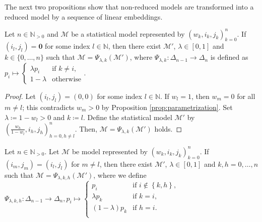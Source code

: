 The next two propositions show that non-reduced models are transformed into a reduced model by a sequence of linear embeddings.

\begin{proposition}\label{prop:linear-embedding-1}
    Let \( n \in \mathbb{N}_{>0} \) and \( \mathcal{M} \) be a statistical model represented by \( (w_k, i_k, j_k)_{k=0}^n \). If \( (i_l, j_l) = \mathbf{0} \) for some index \( l \in \mathbb{N} \), then there exist \( \mathcal{M}' \), \( \lambda \in [0,1] \) and \( k \in \{ 0, \dots, n \} \) such that \( \mathcal{M} = \Psi_{\lambda,k}(\mathcal{M}') \), where \( \Psi_{\lambda, k}: \Delta_{n-1} \to \Delta_n \) is defined as \(  p_i \mapsto \begin{cases}
        \lambda p_i & \text{if } k \neq i, \\
        1-\lambda & \text{otherwise}
    \end{cases} \).
\end{proposition}

\begin{proof}
    Let \( (i_l, j_l) = (0,0) \) for some index \( l \in \mathbb{N} \). If \( w_l = 1 \), then \( w_m = 0 \) for all \( m \neq l \); this contradicts \( w_m > 0 \) by Proposition \ref{prop:parametrization}. Set \( \lambda \coloneqq 1 - w_l > 0 \) and \( k \coloneqq l \). Define the statistical model \( \mathcal{M}' \) by \( \left(\frac{w_h}{1-w_l}, i_h, j_h\right)^n_{h=0, h \neq l} \).
    Then, \( \mathcal{M} = \Psi_{\lambda,k}(\mathcal{M}') \) holds.
\end{proof}

\begin{proposition}\label{prop:linear-embedding-2}
    Let \( n \in \mathbb{N}_{>0} \).
    Let \( \mathcal{M} \) be model represented by \( (w_k, i_k, j_k)_{k=0}^n \). If \( (i_m, j_m) = (i_l, j_l)  \) for \( m \neq l \), then there exist \( \mathcal{M}' \), \( \lambda \in [0,1] \) and \( k,h = 0, \dots, n \) such that \( \mathcal{M} = \Psi_{\lambda,k,h}(\mathcal{M}') \), 
    where we define \( \Psi_{\lambda, k,h}: \Delta_{n-1} \to \Delta_n,  p_i \mapsto \begin{cases}
         p_i & \text{if } i \notin \left\{ k,h \right\}, \\
        \lambda p_k & \text{if } k = i, \\
        (1-\lambda) p_k & \text{if } h = i. \\
    \end{cases} \)
\end{proposition}

